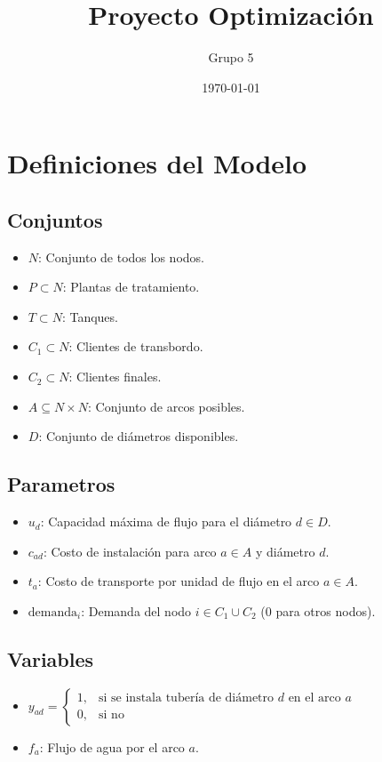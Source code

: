 \documentclass[12pt]{article}
\title{Proyecto Optimización}
\author{Grupo 5}
\date{\today}
\begin{document}
\maketitle


\section{Definiciones del Modelo}

\subsection*{Conjuntos}
\begin{itemize}
\item $N$: Conjunto de todos los nodos.
\item $P \subset N$: Plantas de tratamiento.
\item $T \subset N$: Tanques.
\item $C_1 \subset N$: Clientes de transbordo.
\item $C_2 \subset N$: Clientes finales.
\item $A \subseteq N\times N$: Conjunto de arcos posibles.
\item $D$: Conjunto de diámetros disponibles.
\end{itemize}

\subsection*{Parametros}
\begin{itemize}
\item $u_d$: Capacidad máxima de flujo para el diámetro $d \in D$.
\item $c_{ad}$: Costo de instalación para arco $a \in A$ y diámetro $d$.
\item $t_a$: Costo de transporte por unidad de flujo en el arco $a \in A$.
\item $\text{demanda}_i$: Demanda del nodo $i \in C_1 \cup C_2$ (0 para otros nodos).
\end{itemize}

\subsection*{Variables}
\begin{itemize}

\item $y_{ad} = 
\begin{cases} 
1, & \text{si se instala tubería de diámetro } d \text{ en el arco } a\\
0, & \text{si no}
\end{cases}$

\item $f_{a}$: Flujo de agua por el arco $a$.
\end{itemize}
\end{document}
